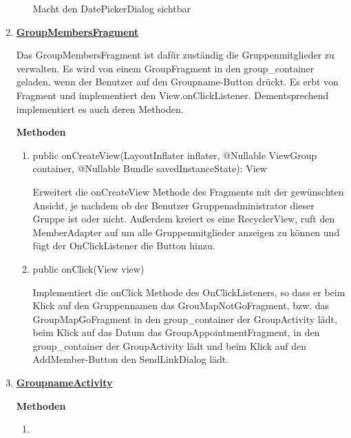 \begin{enumerate}
\begin{enumerate}
		Macht den DatePickerDialog sichtbar
	
	\end{enumerate}


	\item \textbf{\underline{GroupMembersFragment}}
	
	Das GroupMembersFragment ist dafür zuständig die Gruppenmitglieder zu verwalten. Es wird von einem GroupFragment in den group\_container geladen, wenn der Benutzer auf den Groupname-Button drückt. Es erbt von Fragment und implementiert den View.onClickListener. Dementsprechend implementiert es auch deren Methoden.
	
	\textbf{Methoden}
	\begin{enumerate}
		\item public onCreateView(LayoutInflater inflater, @Nullable ViewGroup container, @Nullable Bundle savedInstanceState): View
		
		Erweitert die onCreateView Methode des Fragments mit der gewünschten Ansicht, je nachdem ob der Benutzer Gruppenadministrator dieser Gruppe ist oder nicht. Außerdem kreiert es eine RecyclerView, ruft den MemberAdapter auf um alle Gruppenmitglieder anzeigen zu können und fügt der OnClickListener die Button hinzu.
		
		\item public onClick(View view)
		
		Implementiert die onClick Methode des OnClickListeners, so dass er beim Klick auf den Gruppennamen das GrouMapNotGoFragment, bzw. das GroupMapGoFragment in den group\_container der GroupActivity lädt, beim Klick auf das Datum das GroupAppointmentFragment, in den group\_container der GroupActivity lädt und beim Klick auf den AddMember-Button den SendLinkDialog lädt.
	\end{enumerate}

	\item \textbf{\underline{GroupnameActivity}}
	
	
	\textbf{Methoden}
	\begin{enumerate}
		\item 
		
	\end{enumerate}
	

\end{enumerate}
